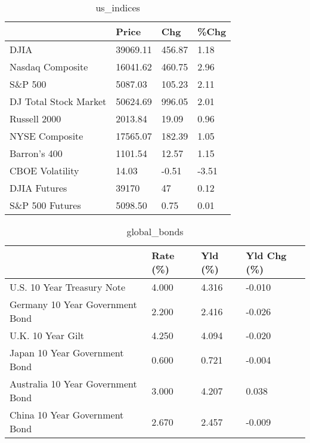 \documentclass{article}%
\begin{document}
%


\begin{table}[htbp]%
\caption{us\_indices}%
\centering%
\begin{adjustbox}{width=1\textwidth}%
\begin{tabular}{llll}
\toprule
                      &    Price &    Chg &  \%Chg \\
\midrule
                 DJIA & 39069.11 & 456.87 &  1.18 \\
     Nasdaq Composite & 16041.62 & 460.75 &  2.96 \\
              S\&P 500 &  5087.03 & 105.23 &  2.11 \\
DJ Total Stock Market & 50624.69 & 996.05 &  2.01 \\
         Russell 2000 &  2013.84 &  19.09 &  0.96 \\
       NYSE Composite & 17565.07 & 182.39 &  1.05 \\
         Barron's 400 &  1101.54 &  12.57 &  1.15 \\
      CBOE Volatility &    14.03 &  -0.51 & -3.51 \\
         DJIA Futures &    39170 &     47 &  0.12 \\
      S\&P 500 Futures &  5098.50 &   0.75 &  0.01 \\
\bottomrule
\end{tabular}
%
\end{adjustbox}%
\end{table}

%


\begin{table}[htbp]%
\caption{global\_bonds}%
\centering%
\begin{adjustbox}{width=1\textwidth}%
\begin{tabular}{llll}
\toprule
                                  & Rate (\%) & Yld (\%) & Yld Chg (\%) \\
\midrule
       U.S. 10 Year Treasury Note &    4.000 &   4.316 &      -0.010 \\
  Germany 10 Year Government Bond &    2.200 &   2.416 &      -0.026 \\
                U.K. 10 Year Gilt &    4.250 &   4.094 &      -0.020 \\
    Japan 10 Year Government Bond &    0.600 &   0.721 &      -0.004 \\
Australia 10 Year Government Bond &    3.000 &   4.207 &       0.038 \\
    China 10 Year Government Bond &    2.670 &   2.457 &      -0.009 \\
\bottomrule
\end{tabular}
%
\end{adjustbox}%
\end{table}
\end{document}
